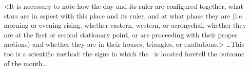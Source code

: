 \mndl <It is necessary to note how the day and its ruler are configured together, what stars are in aspect with this place and its ruler, and at what phase they are (i.e. morning or evening rising, whether eastern,
western, or acronychal, whether they are at the first or second stationary point, or are proceeding with their proper motions) and whether they are in their houses, triangles, or exaltations.>
…This too is a scientific method: the signs in which the \Sun\, is located foretell the outcome of the month…


\newpage
